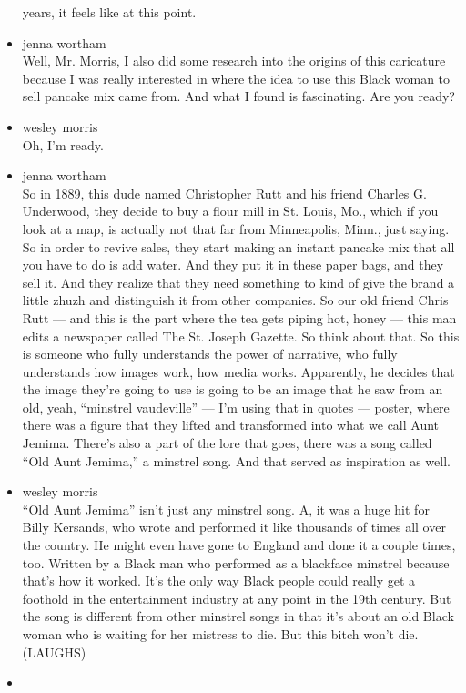 \begin{itemize}
  years, it feels like at this point.
\item
  jenna wortham\\
  Well, Mr. Morris, I also did some research into the origins of this
  caricature because I was really interested in where the idea to use
  this Black woman to sell pancake mix came from. And what I found is
  fascinating. Are you ready?
\item
  wesley morris\\
  Oh, I'm ready.
\item
  jenna wortham\\
  So in 1889, this dude named Christopher Rutt and his friend Charles G.
  Underwood, they decide to buy a flour mill in St. Louis, Mo., which if
  you look at a map, is actually not that far from Minneapolis, Minn.,
  just saying. So in order to revive sales, they start making an instant
  pancake mix that all you have to do is add water. And they put it in
  these paper bags, and they sell it. And they realize that they need
  something to kind of give the brand a little zhuzh and distinguish it
  from other companies. So our old friend Chris Rutt --- and this is the
  part where the tea gets piping hot, honey --- this man edits a
  newspaper called The St. Joseph Gazette. So think about that. So this
  is someone who fully understands the power of narrative, who fully
  understands how images work, how media works. Apparently, he decides
  that the image they're going to use is going to be an image that he
  saw from an old, yeah, ``minstrel vaudeville'' --- I'm using that in
  quotes --- poster, where there was a figure that they lifted and
  transformed into what we call Aunt Jemima. There's also a part of the
  lore that goes, there was a song called ``Old Aunt Jemima,'' a
  minstrel song. And that served as inspiration as well.
\item
  wesley morris\\
  ``Old Aunt Jemima'' isn't just any minstrel song. A, it was a huge hit
  for Billy Kersands, who wrote and performed it like thousands of times
  all over the country. He might even have gone to England and done it a
  couple times, too. Written by a Black man who performed as a blackface
  minstrel because that's how it worked. It's the only way Black people
  could really get a foothold in the entertainment industry at any point
  in the 19th century. But the song is different from other minstrel
  songs in that it's about an old Black woman who is waiting for her
  mistress to die. But this bitch won't die. (LAUGHS)
\item

\end{itemize}
